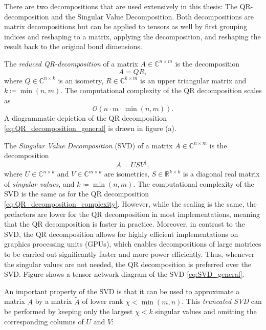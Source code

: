 There are two decompositions that are used extensively in this thesis: The QR-decomposition and the Singular Value Decomposition. Both decompositions are matrix decompositions but can be applied to tensors as well by first grouping indices and reshaping to a matrix, applying the decomposition, and reshaping the result back to the original bond dimensions. \par
The \textit{reduced QR-decomposition} of a matrix $A \in \mathbb{C}^{n\times m}$ is the decomposition
\begin{equation}
	\label{eq:QR_decomposition_general}
	A = QR,
\end{equation}
where $Q\in\mathbb{C}^{n\times k}$ is an isometry, $R\in\mathbb{C}^{k\times m}$ is an upper triangular matrix and $k \coloneqq \min(n, m)$. The computational complexity of the QR decomposition scales as
\begin{equation}
	\label{eq:QR_decomposition_complexity}
	\mathcal{O}\left(n\cdot m\cdot\min(n, m)\right).
\end{equation}
A diagrammatic depiction of the QR decomposition \eqref{eq:QR_decomposition_general} is drawn in figure (a). \par
The \textit{Singular Value Decomposition} (SVD) of a matrix $A \in \mathbb{C}^{n\times m}$ is the decomposition
\begin{equation}
	\label{eq:SVD_general}
	A = USV^\dagger,
\end{equation}
where $U\in\mathbb{C}^{n\times k}$ and $V\in\mathbb{C}^{m\times k}$ are isometries, $S\in\mathbb{R}^{k\times k}$ is a diagonal real matrix of \textit{singular values}, and $k \coloneqq \min(n, m)$. The computational complexity of the SVD is the same as for the QR decomposition \eqref{eq:QR_decomposition_complexity}. However, while the scaling is the same, the prefactors are lower for the QR decomposition in most implementations, meaning that the QR decomposition is faster in practice. Moreover, in contrast to the SVD, the QR decomposition allows for highly efficient implementations on graphics processing units (GPUs), which enables decompositions of large matrices to be carried out significantly faster and more power efficiently. Thus, whenever the singular values are not needed, the QR decomposition is preferred over the SVD. Figure  shows a tensor network diagram of the SVD \eqref{eq:SVD_general}. \par
An important property of the SVD is that it can be used to approximate a matrix $A$ by a matrix $\tilde{A}$ of lower rank $\chi < \min(m, n)$. This \textit{truncated SVD} can be performed by keeping only the largest $\chi < k$ singular values and omitting the corresponding columns of $U$ and $V$:
